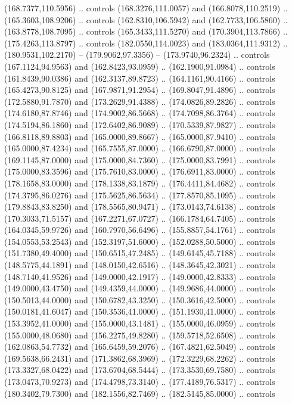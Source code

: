   (168.7377,110.5956) .. controls (168.3276,111.0057) and (166.8078,110.2519) ..
  (165.3603,108.9206) .. controls (162.8310,106.5942) and (162.7733,106.5860) ..
  (163.8778,108.7095) .. controls (165.3433,111.5270) and (170.3904,113.7866) ..
  (175.4263,113.8797) .. controls (182.0550,114.0023) and (183.0364,111.9312) ..
  (180.9531,102.2170) -- (179.9062,97.3356) -- (173.9740,96.2324) .. controls
  (167.1124,94.9563) and (162.8423,93.0959) .. (162.1900,91.0984) .. controls
  (161.8439,90.0386) and (162.3137,89.8723) .. (164.1161,90.4166) .. controls
  (165.4273,90.8125) and (167.9871,91.2954) .. (169.8047,91.4896) .. controls
  (172.5880,91.7870) and (173.2629,91.4388) .. (174.0826,89.2826) .. controls
  (174.6180,87.8746) and (174.9002,86.5668) .. (174.7098,86.3764) .. controls
  (174.5194,86.1860) and (172.6402,86.9089) .. (170.5339,87.9827) .. controls
  (166.8118,89.8803) and (165.0000,89.8667) .. (165.0000,87.9410) .. controls
  (165.0000,87.4234) and (165.7555,87.0000) .. (166.6790,87.0000) .. controls
  (169.1145,87.0000) and (175.0000,84.7360) .. (175.0000,83.7991) .. controls
  (175.0000,83.3596) and (175.7610,83.0000) .. (176.6911,83.0000) .. controls
  (178.1658,83.0000) and (178.1338,83.1879) .. (176.4411,84.4682) .. controls
  (174.3795,86.0276) and (175.5625,86.5634) .. (177.8570,85.1095) .. controls
  (179.8843,83.8250) and (178.5565,80.9471) .. (173.0143,74.6138) .. controls
  (170.3033,71.5157) and (167.2271,67.0727) .. (166.1784,64.7405) .. controls
  (164.0345,59.9726) and (160.7970,56.6496) .. (155.8857,54.1761) .. controls
  (154.0553,53.2543) and (152.3197,51.6000) .. (152.0288,50.5000) .. controls
  (151.7380,49.4000) and (150.6515,47.2485) .. (149.6145,45.7188) .. controls
  (148.5775,44.1891) and (148.0150,42.6516) .. (148.3645,42.3021) .. controls
  (148.7140,41.9526) and (149.0000,42.1917) .. (149.0000,42.8333) .. controls
  (149.0000,43.4750) and (149.4359,44.0000) .. (149.9686,44.0000) .. controls
  (150.5013,44.0000) and (150.6782,43.3250) .. (150.3616,42.5000) .. controls
  (150.0181,41.6047) and (150.3536,41.0000) .. (151.1930,41.0000) .. controls
  (153.3952,41.0000) and (155.0000,43.1481) .. (155.0000,46.0959) .. controls
  (155.0000,48.0680) and (156.2275,49.8280) .. (159.5718,52.6508) .. controls
  (162.0863,54.7732) and (165.6459,59.2076) .. (167.4821,62.5049) .. controls
  (169.5638,66.2431) and (171.3862,68.3969) .. (172.3229,68.2262) .. controls
  (173.3327,68.0422) and (173.6704,68.5444) .. (173.3530,69.7580) .. controls
  (173.0473,70.9273) and (174.4798,73.3140) .. (177.4189,76.5317) .. controls
  (180.3402,79.7300) and (182.1556,82.7469) .. (182.5145,85.0000) .. controls

